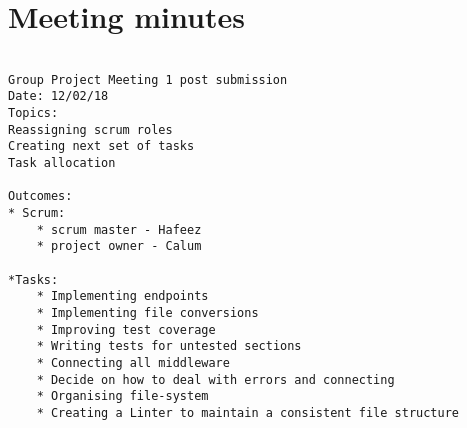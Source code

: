 \section{Meeting minutes}\label{app:meet}
\begin{lstlisting}

Group Project Meeting 1 post submission
Date: 12/02/18
Topics:
Reassigning scrum roles
Creating next set of tasks
Task allocation

Outcomes:
* Scrum:
    * scrum master - Hafeez
    * project owner - Calum

*Tasks:
    * Implementing endpoints
    * Implementing file conversions
    * Improving test coverage
    * Writing tests for untested sections
    * Connecting all middleware
    * Decide on how to deal with errors and connecting
    * Organising file-system
    * Creating a Linter to maintain a consistent file structure

\end{lstlisting}
